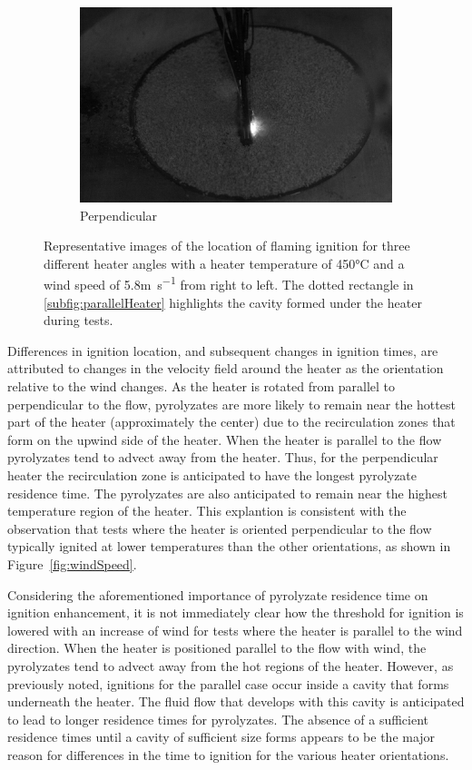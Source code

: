\begin{figure}[hpbt]
\begin{subfigure}[b]{0.5\columnwidth}
                 \centering
                 \includegraphics[width=0.75\columnwidth, trim={12cm 5cm 10cm 5cm}, clip]{Figures/5ms_90_heater_450.png}
                 \caption{Perpendicular}
                 \label{subfig:perpendicularHeater}
             \end{subfigure}
                \caption{Representative images of the location of flaming ignition for three different heater angles with a heater temperature of 450\si{\celsius} and a wind speed of 5.8\si{\meter\per\second} from right to left. The dotted rectangle in \ref{subfig:parallelHeater} highlights the cavity formed under the heater during tests.}
                \label{fig:ignitionImages}
        \end{figure}
    Differences in ignition location, and subsequent changes in ignition times, are attributed to changes in the velocity field around the heater as the orientation relative to the wind changes. As the heater is rotated from parallel to perpendicular to the flow, pyrolyzates are more likely to remain near the hottest part of the heater (approximately the center) due to the recirculation zones that form on the upwind side of the heater. When the heater is parallel to the flow pyrolyzates tend to advect away from the heater. Thus, for the perpendicular heater the recirculation zone is anticipated to have the longest pyrolyzate residence time. The pyrolyzates are also anticipated to remain near the highest temperature region of the heater. This explantion is consistent with the observation that tests where the heater is oriented perpendicular to the flow typically ignited at lower temperatures than the other orientations, as shown in Figure~\ref{fig:windSpeed}.
    
    Considering the aforementioned importance of pyrolyzate residence time on ignition enhancement, it is not immediately clear how the threshold for ignition is lowered with an increase of wind for tests where the heater is parallel to the wind direction. When the heater is positioned parallel to the flow with wind, the pyrolyzates tend to advect away from the hot regions of the heater. However, as previously noted, ignitions for the parallel case occur inside a cavity that forms underneath the heater. The fluid flow that develops with this cavity is anticipated to lead to longer residence times for pyrolyzates. The absence of a sufficient residence times until a cavity of sufficient size forms appears to be the major reason for differences in the time to ignition for the various heater orientations.
    

